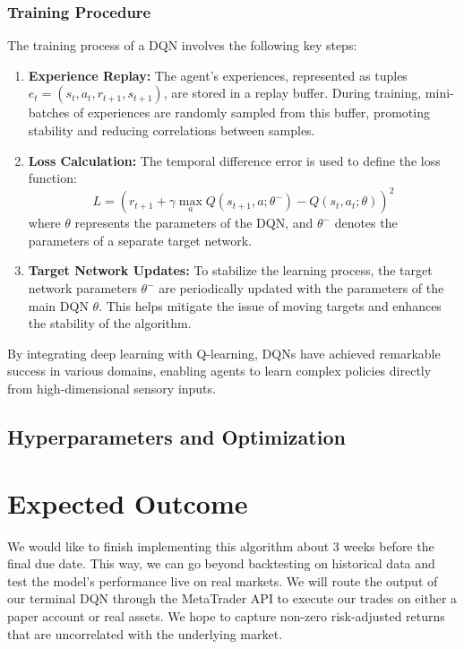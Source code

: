 \documentclass{article}
\begin{document}
\subsubsection{Training Procedure}

The training process of a DQN involves the following key steps:
\begin{enumerate}
  \item \textbf{Experience Replay:} The agent's experiences, represented as tuples $e_t = (s_t, a_t, r_{t+1}, s_{t+1})$, are stored in a replay buffer. During training, mini-batches of experiences are randomly sampled from this buffer, promoting stability and reducing correlations between samples.
  \item \textbf{Loss Calculation:} The temporal difference error is used to define the loss function:
  \begin{equation}
    L = \left( r_{t+1} + \gamma \max_{a} Q(s_{t+1}, a; \theta^-) - Q(s_t, a_t; \theta) \right)^2
  \end{equation}
  where $\theta$ represents the parameters of the DQN, and $\theta^-$ denotes the parameters of a separate target network.
  \item \textbf{Target Network Updates:} To stabilize the learning process, the target network parameters $\theta^-$ are periodically updated with the parameters of the main DQN $\theta$. This helps mitigate the issue of moving targets and enhances the stability of the algorithm.
\end{enumerate}

By integrating deep learning with Q-learning, DQNs have achieved remarkable success in various domains, enabling agents to learn complex policies directly from high-dimensional sensory inputs.


\subsection{Hyperparameters and Optimization}




\section{Expected Outcome}
We would like to finish implementing this algorithm about 3 weeks before the final due date. This way, we can go beyond backtesting on historical data and test the model's performance live on real markets. We will route the output of our terminal DQN through the MetaTrader API to execute our trades on either a paper account or real assets. We hope to capture non-zero risk-adjusted returns that are uncorrelated with the underlying market. 
\end{document}
